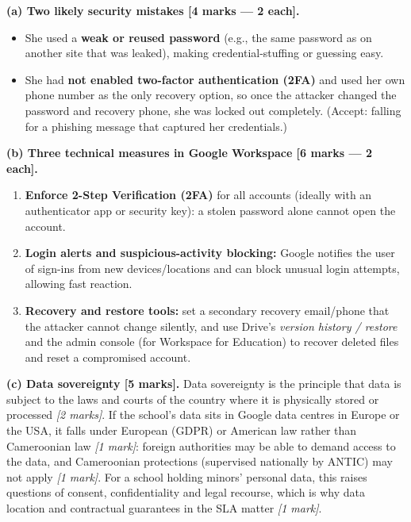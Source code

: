 \documentclass[11pt]{article}
\newcommand{\cle}[1]{{\popxbold\color{popdark}#1}}
\begin{document}
\begin{corrige}
\textbf{(a) Two likely security mistakes [4 marks — 2 each].}
\begin{itemize}
\item She used a \textbf{weak or reused password} (e.g., the same password as on another site that was leaked), making credential-stuffing or guessing easy.
\item She had \textbf{not enabled two-factor authentication (2FA)} and used her own phone number as the only recovery option, so once the attacker changed the password and recovery phone, she was locked out completely. (Accept: falling for a phishing message that captured her credentials.)
\end{itemize}

\textbf{(b) Three technical measures in Google Workspace [6 marks — 2 each].}
\begin{enumerate}
\item \textbf{Enforce 2-Step Verification (2FA)} for all accounts (ideally with an authenticator app or security key): a stolen password alone cannot open the account.
\item \textbf{Login alerts and suspicious-activity blocking:} Google notifies the user of sign-ins from new devices/locations and can block unusual login attempts, allowing fast reaction.
\item \textbf{Recovery and restore tools:} set a secondary recovery email/phone that the attacker cannot change silently, and use Drive's \emph{version history / restore} and the admin console (for Workspace for Education) to recover deleted files and reset a compromised account.
\end{enumerate}

\textbf{(c) Data sovereignty [5 marks].} \cle{Data sovereignty} is the principle that data is subject to the laws and courts of the country where it is physically stored or processed \emph{[2 marks]}. If the school's data sits in Google data centres in Europe or the USA, it falls under European (GDPR) or American law rather than Cameroonian law \emph{[1 mark]}: foreign authorities may be able to demand access to the data, and Cameroonian protections (supervised nationally by ANTIC) may not apply \emph{[1 mark]}. For a school holding minors' personal data, this raises questions of consent, confidentiality and legal recourse, which is why data location and contractual guarantees in the SLA matter \emph{[1 mark]}.
\end{corrige}
\end{document}
